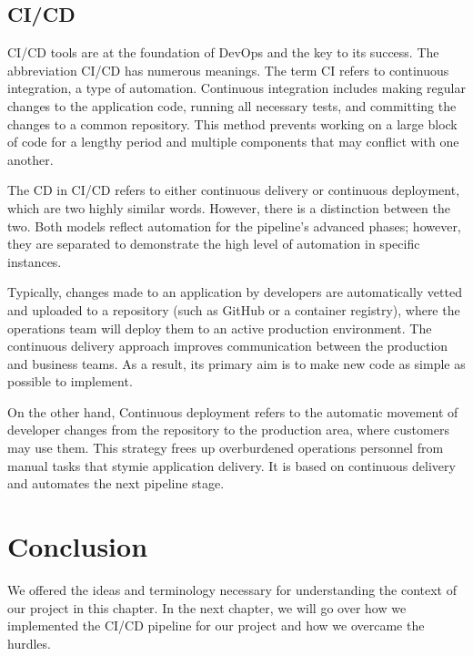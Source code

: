 \subsection{CI/CD} 

\qquad
CI/CD tools are at the foundation of DevOps and the key to its success. The abbreviation CI/CD has numerous meanings.
The term CI refers to continuous integration, a type of automation. Continuous integration includes making regular changes to the application code, running all necessary tests, and committing the changes to a common repository. This method prevents working on a large block of code for a lengthy period and multiple components that may conflict with one another.

The CD in CI/CD refers to either continuous delivery or continuous deployment, which are two highly similar words. However, there is a distinction between the two. Both models reflect automation for the pipeline's advanced phases; however, they are separated to demonstrate the high level of automation in specific instances.

Typically, changes made to an application by developers are automatically vetted and uploaded to a repository (such as GitHub or a container registry), where the operations team will deploy them to an active production environment. The continuous delivery approach improves communication between the production and business teams. As a result, its primary aim is to make new code as simple as possible to implement.

On the other hand, Continuous deployment refers to the automatic movement of developer changes from the repository to the production area, where customers may use them. This strategy frees up overburdened operations personnel from manual tasks that stymie application delivery. It is based on continuous delivery and automates the next pipeline stage.

\section*{Conclusion}

We offered the ideas and terminology necessary for understanding the context of our project in this chapter. In the next chapter, we will go over how we implemented the CI/CD pipeline for our project and how we overcame the hurdles.

\qquad

